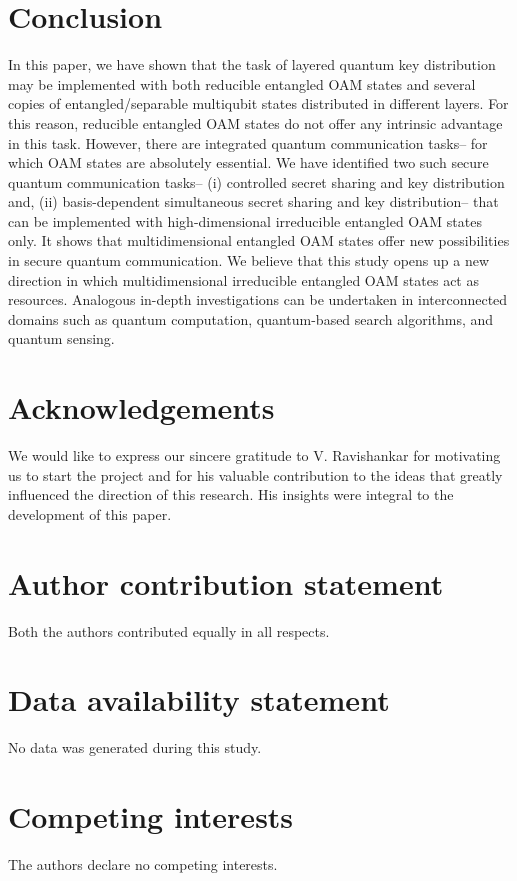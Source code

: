\documentclass[fleqn,10pt]{wlscirep}
\begin{document}
\section*{Conclusion}
\hypertarget{Conclusions}{}
In this paper, we have shown that the task of layered quantum key distribution may be implemented with both reducible entangled OAM states and several copies of entangled/separable multiqubit states distributed in different layers. For this reason, reducible entangled OAM states do not offer any intrinsic advantage in this task. However, there are integrated quantum communication tasks-- for which OAM states are absolutely essential. We have identified two such secure quantum communication tasks-- (i) controlled secret sharing and key distribution and, (ii) basis-dependent simultaneous secret sharing and key distribution-- that can be implemented with high-dimensional irreducible entangled OAM states only. It shows that multidimensional entangled OAM states offer new possibilities in secure quantum communication. We believe that this study opens up a new direction in which multidimensional irreducible entangled OAM states act as resources. Analogous in-depth investigations can be undertaken in interconnected domains such as quantum computation, quantum-based search algorithms, and quantum sensing. 


\section*{Acknowledgements}
We would like to express our sincere gratitude to V. Ravishankar for motivating us to start the project and for his valuable contribution to the ideas that greatly influenced the direction of this research. His insights were integral to the development of this paper. 

\section*{Author contribution statement}
Both the authors contributed equally in all respects.

\section*{Data availability statement}
No data was generated during this study.


\noindent\section*{Competing interests} 
The authors declare no competing interests.
%
\end{document}
